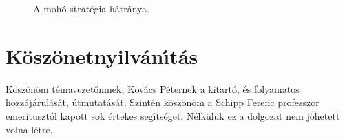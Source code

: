 \documentclass[oneside,titlepage,12pt,a4paper]{report}
\begin{document}
\begin{figure}[htb!]
\caption{A mohó stratégia hátránya.}
\label{fig:counterexample}
\end{figure}	

\section*{K\"osz\"onetnyilv\'an\'\i t\'as}

K\"osz\"on\"om t\'emavezet\H omnek, Kov\'acs P\'eternek a
kitart\'o, \'es folyamatos hozz\'aj\'arul\'as\'at, \'utmutat\'as\'at. 
Szint\'en k\"osz\"on\"om a Schipp Ferenc professzor emeritusztól kapott sok \'ertekes seg\'\i ts\'eget.   
N\'elk\"ul\"uk ez a dolgozat nem j\"ohetett volna l\'etre.


\appendix
\appendixpage
\addappheadtotoc
\end{document}
